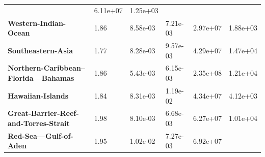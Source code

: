 \begin{table}[H]
{\begin{tabular}{llllll}
                                                                & 6.11e+07
                                                                & 1.25e+03
            \\
            \textbf{Western-Indian-Ocean}                       & 1.86
                                                                & 8.58e-03
                                                                & 7.21e-03
                                                                & 2.97e+07
                                                                & 1.88e+03
            \\
            \textbf{Southeastern-Asia}                          & 1.77
                                                                & 8.28e-03
                                                                & 9.57e-03
                                                                & 4.29e+07
                                                                & 1.47e+04
            \\
            \textbf{Northern-Caribbean--Florida---Bahamas}      & 1.86
                                                                & 5.43e-03
                                                                &
            6.15e-03                                            & 2.35e+08
                                                                & 1.21e+04
            \\
            \textbf{Hawaiian-Islands}                           & 1.84
                                                                & 8.31e-03
                                                                & 1.19e-02
                                                                & 4.34e+07
                                                                & 4.12e+03
            \\
            \textbf{Great-Barrier-Reef-and-Torres-Strait}       & 1.98
                                                                & 8.10e-03
                                                                &
            6.68e-03                                            & 6.27e+07
                                                                & 1.01e+04
            \\
            \textbf{Red-Sea---Gulf-of-Aden}                     & 1.95
                                                                & 1.02e-02
                                                                & 7.27e-03
                                                                & 6.92e+07

\end{tabular}}
\end{table}
